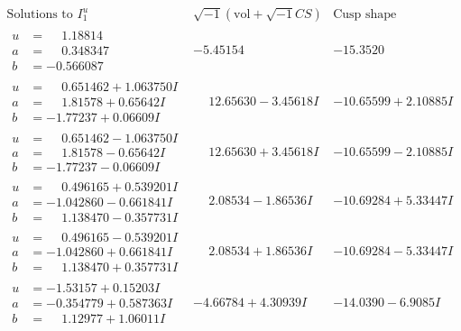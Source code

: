 \documentclass[1p]{elsarticle_modified}
\theoremstyle{definition}
\newcommand{\I}{\sqrt{-1}}
\begin{document}
$$\begin{array}{c|c|c}  
\text{Solutions to }I^u_{1}& \I (\text{vol} + \sqrt{-1}CS) & \text{Cusp shape}\\
 \hline 
\begin{aligned}
u &= \phantom{-}1.18814\phantom{ +0.000000I} \\
a &= \phantom{-}0.348347\phantom{ +0.000000I} \\
b &= -0.566087\phantom{ +0.000000I}\end{aligned}
 & -5.45154\phantom{ +0.000000I} & -15.3520\phantom{ +0.000000I} \\ \hline\begin{aligned}
u &= \phantom{-}0.651462 + 1.063750 I \\
a &= \phantom{-}1.81578 + 0.65642 I \\
b &= -1.77237 + 0.06609 I\end{aligned}
 & \phantom{-}12.65630 - 3.45618 I & -10.65599 + 2.10885 I \\ \hline\begin{aligned}
u &= \phantom{-}0.651462 - 1.063750 I \\
a &= \phantom{-}1.81578 - 0.65642 I \\
b &= -1.77237 - 0.06609 I\end{aligned}
 & \phantom{-}12.65630 + 3.45618 I & -10.65599 - 2.10885 I \\ \hline\begin{aligned}
u &= \phantom{-}0.496165 + 0.539201 I \\
a &= -1.042860 - 0.661841 I \\
b &= \phantom{-}1.138470 - 0.357731 I\end{aligned}
 & \phantom{-}2.08534 - 1.86536 I & -10.69284 + 5.33447 I \\ \hline\begin{aligned}
u &= \phantom{-}0.496165 - 0.539201 I \\
a &= -1.042860 + 0.661841 I \\
b &= \phantom{-}1.138470 + 0.357731 I\end{aligned}
 & \phantom{-}2.08534 + 1.86536 I & -10.69284 - 5.33447 I \\ \hline\begin{aligned}
u &= -1.53157 + 0.15203 I \\
a &= -0.354779 + 0.587363 I \\
b &= \phantom{-}1.12977 + 1.06011 I\end{aligned}
 & -4.66784 + 4.30939 I & -14.0390 - 6.9085 I \\ \hline\begin{aligned}

\end{aligned}
\end{array}$$
\end{document}
